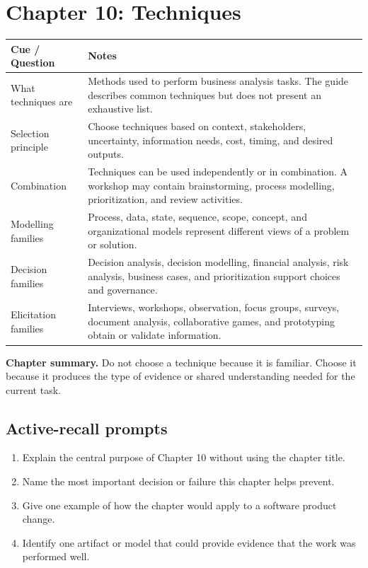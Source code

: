 \documentclass[11pt]{article}
\begin{document}
\section{Chapter 10: Techniques}
\begin{longtable}{L{0.26\textwidth} L{0.64\textwidth}}
\toprule
\textbf{Cue / Question} & \textbf{Notes}\\
\midrule
\endhead
What techniques are & Methods used to perform business analysis tasks. The guide describes common techniques but does not present an exhaustive list.\\
Selection principle & Choose techniques based on context, stakeholders, uncertainty, information needs, cost, timing, and desired outputs.\\
Combination & Techniques can be used independently or in combination. A workshop may contain brainstorming, process modelling, prioritization, and review activities.\\
Modelling families & Process, data, state, sequence, scope, concept, and organizational models represent different views of a problem or solution.\\
Decision families & Decision analysis, decision modelling, financial analysis, risk analysis, business cases, and prioritization support choices and governance.\\
Elicitation families & Interviews, workshops, observation, focus groups, surveys, document analysis, collaborative games, and prototyping obtain or validate information.\\
\bottomrule
\end{longtable}
\begin{keybox}\textbf{Chapter summary.} Do not choose a technique because it is familiar. Choose it because it produces the type of evidence or shared understanding needed for the current task.\end{keybox}
\subsection*{Active-recall prompts}
\begin{enumerate}
\item Explain the central purpose of Chapter 10 without using the chapter title.
\item Name the most important decision or failure this chapter helps prevent.
\item Give one example of how the chapter would apply to a software product change.
\item Identify one artifact or model that could provide evidence that the work was performed well.
\end{enumerate}
\end{document}
